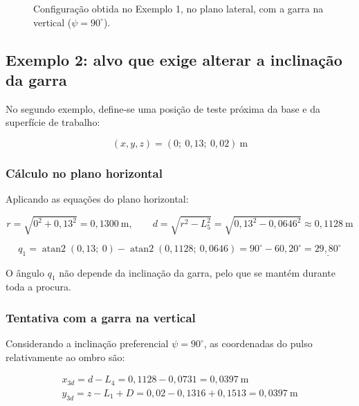 \begin{figure}[H]
    \centering
    \resizebox{0.5\textwidth}{!}{
        
    }
    \caption{Configuração obtida no Exemplo 1, no plano lateral, com a garra na vertical ($\psi=90^\circ$).}
    \label{fig:exemplo1}
\end{figure}

\subsection{Exemplo 2: alvo que exige alterar a inclinação da garra}

No segundo exemplo, define-se uma posição de teste próxima da base e da superfície de trabalho:

\begin{equation}
    (x,y,z)=(0;\ 0{,}13;\ 0{,}02)\ \text{m}
\end{equation}

\subsubsection*{Cálculo no plano horizontal}

Aplicando as equações do plano horizontal:

\begin{equation}
    \label{eq:exemplo2}
    r=\sqrt{0^2+0{,}13^2}=0{,}1300\ \text{m},\qquad
    d=\sqrt{r^2-L_5^2}=\sqrt{0{,}13^2-0{,}0646^2}\approx0{,}1128\ \text{m}
\end{equation}

\begin{equation}
    q_1=\operatorname{atan2}(0{,}13;\ 0)-\operatorname{atan2}(0{,}1128;\ 0{,}0646)
    =90^\circ-60{,}20^\circ=\underline{29{,}80^\circ}
\end{equation}

O ângulo $q_1$ não depende da inclinação da garra, pelo que se mantém durante toda a procura.

\subsubsection*{Tentativa com a garra na vertical}

Considerando a inclinação preferencial $\psi=90^\circ$, as coordenadas do pulso relativamente ao ombro são:

\begin{equation}
    \begin{gathered}
    x_{3d}=d-L_4=0{,}1128-0{,}0731=0{,}0397\ \text{m}\\
    y_{3d}=z-L_1+D=0{,}02-0{,}1316+0{,}1513=0{,}0397\ \text{m}
    \end{gathered}
\end{equation}

